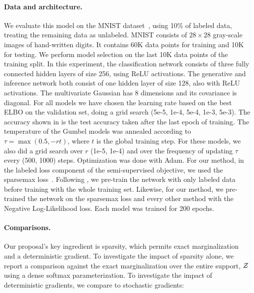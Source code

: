 \paragraph*{Data and architecture.} We evaluate this model on the
MNIST dataset~\citep{lecun1998gradient}, using 10\% of labeled data,
treating the remaining data as unlabeled. MNIST consists of $28
    \times 28$ gray-scale images of hand-written digits. It contains
60K data points for training and 10K for testing. We
perform model selection on the last 10K data points of the training
split. In this experiment, the classification network consists of
three fully connected hidden layers of size 256, using ReLU
activations. The generative and inference network both consist of one
hidden layer of size 128, also with ReLU activations. The
multivariate Gaussian has 8 dimensions and its covariance is
diagonal. For all models we have chosen the learning rate based on
the best ELBO on the validation set, doing a grid search (5e-5, 1e-4,
5e-4, 1e-3, 5e-3). The accuracy shown in  is
the test accuracy taken after the last epoch of training. The
temperature of the Gumbel models was annealed according to $\tau =
    \max\left(0.5, -rt\right)$, where $t$ is the global training step.
For these models, we also did a grid search over $r$ (1e-5, 1e-4) and
over the frequency of updating $\tau$ every (500, 1000) steps.
Optimization was done with Adam. For our method, in the labeled loss
component of the semi-supervised objective, we used the sparsemax
loss~\citep{sparsemax}. Following \citet{RB19}, we pre-train
the network with only labeled data before training with the whole
training set. Likewise, for our method, we pre-trained the network on
the sparsemax loss and every other method with the Negative
Log-Likelihood loss. Each model was trained for 200 epochs.

\paragraph*{Comparisons.} Our proposal's key ingredient is sparsity,
which permits exact marginalization and a deterministic gradient. To
investigate the impact of sparsity alone, we report a comparison
against the exact marginalization over the entire support, $\mathcal{Z}$ using
a dense softmax parameterization. To investigate the impact of
deterministic gradients, we compare to stochastic gradients:

